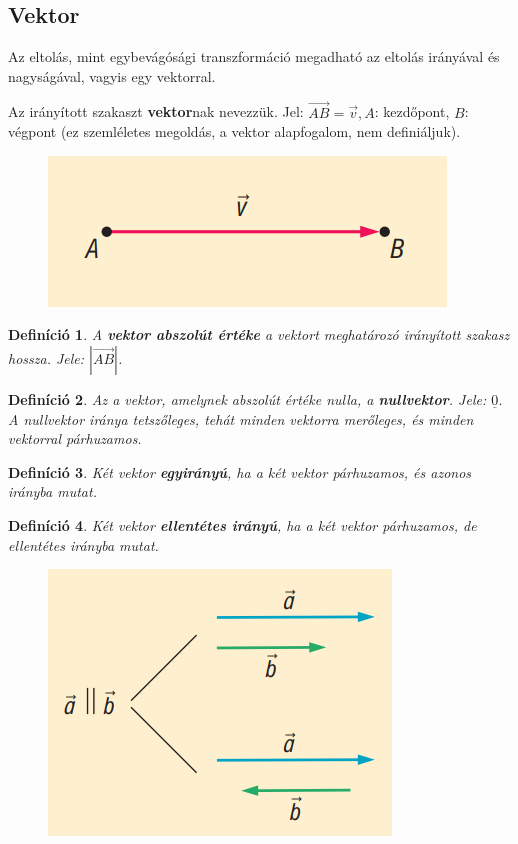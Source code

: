 \documentclass[12pt,a4paper]{article}
\newtheorem{definition}{Definíció} [section]
\begin{document}
\subsection{Vektor}
Az eltolás, mint egybevágósági transzformáció megadható az eltolás irányával és nagyságával, vagyis egy vektorral.

Az irányított szakaszt \textbf{vektor}nak nevezzük. Jel: $\overrightarrow{AB}=\vec{v}, A$: kezdőpont, $B$: végpont (ez szemléletes megoldás, a vektor alapfogalom, nem definiáljuk). 
\begin{figure}[h!]
\centering
\includegraphics[scale=0.3]{geometry/vektor}
\end{figure}

\begin{definition}
A \textbf{vektor abszolút értéke} a vektort meghatározó irányított szakasz hossza. Jele: $|\overrightarrow{AB}|$.
\end{definition}

\begin{definition}
Az a vektor, amelynek abszolút értéke nulla, a \textbf{nullvektor}. Jele: $\underline{0}$. A nullvektor iránya tetszőleges, tehát minden vektorra merőleges, és minden vektorral párhuzamos.
\end{definition}

\begin{definition}
Két vektor \textbf{egyirányú}, ha a két vektor párhuzamos, és azonos irányba mutat.
\end{definition}

\begin{definition}
Két vektor \textbf{ellentétes irányú}, ha a két vektor párhuzamos, de ellentétes irányba mutat.
\end{definition}
\begin{figure}[h!]
\centering
\includegraphics[scale=0.3]{geometry/vektor_irany}
\end{figure}
\end{document}
